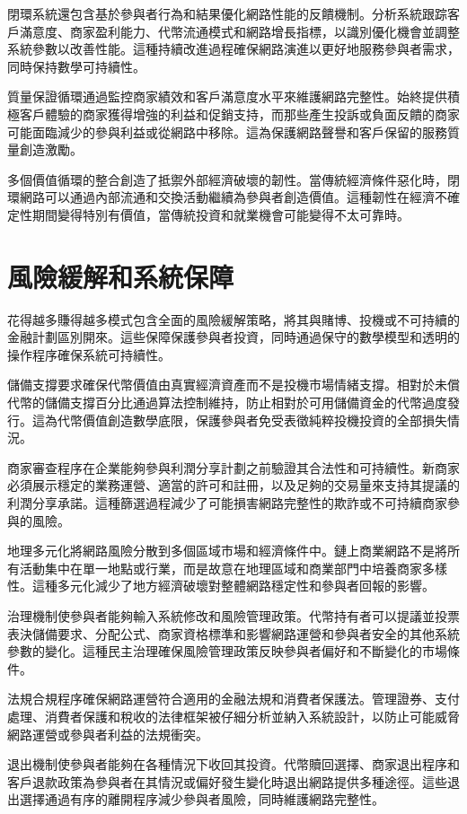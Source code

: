 \documentclass[
  Letterpaper,
]{scrbook}
\begin{document}
閉環系統還包含基於參與者行為和結果優化網路性能的反饋機制。分析系統跟踪客戶滿意度、商家盈利能力、代幣流通模式和網路增長指標，以識別優化機會並調整系統參數以改善性能。這種持續改進過程確保網路演進以更好地服務參與者需求，同時保持數學可持續性。

質量保證循環通過監控商家績效和客戶滿意度水平來維護網路完整性。始終提供積極客戶體驗的商家獲得增強的利益和促銷支持，而那些產生投訴或負面反饋的商家可能面臨減少的參與利益或從網路中移除。這為保護網路聲譽和客戶保留的服務質量創造激勵。

多個價值循環的整合創造了抵禦外部經濟破壞的韌性。當傳統經濟條件惡化時，閉環網路可以通過內部流通和交換活動繼續為參與者創造價值。這種韌性在經濟不確定性期間變得特別有價值，當傳統投資和就業機會可能變得不太可靠時。

\section{風險緩解和系統保障}\label{ux98a8ux96aaux7de9ux89e3ux548cux7cfbux7d71ux4fddux969c}

花得越多賺得越多模式包含全面的風險緩解策略，將其與賭博、投機或不可持續的金融計劃區別開來。這些保障保護參與者投資，同時通過保守的數學模型和透明的操作程序確保系統可持續性。

儲備支撐要求確保代幣價值由真實經濟資產而不是投機市場情緒支撐。相對於未償代幣的儲備支撐百分比通過算法控制維持，防止相對於可用儲備資金的代幣過度發行。這為代幣價值創造數學底限，保護參與者免受表徵純粹投機投資的全部損失情況。

商家審查程序在企業能夠參與利潤分享計劃之前驗證其合法性和可持續性。新商家必須展示穩定的業務運營、適當的許可和註冊，以及足夠的交易量來支持其提議的利潤分享承諾。這種篩選過程減少了可能損害網路完整性的欺詐或不可持續商家參與的風險。

地理多元化將網路風險分散到多個區域市場和經濟條件中。鏈上商業網路不是將所有活動集中在單一地點或行業，而是故意在地理區域和商業部門中培養商家多樣性。這種多元化減少了地方經濟破壞對整體網路穩定性和參與者回報的影響。

治理機制使參與者能夠輸入系統修改和風險管理政策。代幣持有者可以提議並投票表決儲備要求、分配公式、商家資格標準和影響網路運營和參與者安全的其他系統參數的變化。這種民主治理確保風險管理政策反映參與者偏好和不斷變化的市場條件。

法規合規程序確保網路運營符合適用的金融法規和消費者保護法。管理證券、支付處理、消費者保護和稅收的法律框架被仔細分析並納入系統設計，以防止可能威脅網路運營或參與者利益的法規衝突。

退出機制使參與者能夠在各種情況下收回其投資。代幣贖回選擇、商家退出程序和客戶退款政策為參與者在其情況或偏好發生變化時退出網路提供多種途徑。這些退出選擇通過有序的離開程序減少參與者風險，同時維護網路完整性。
\end{document}
